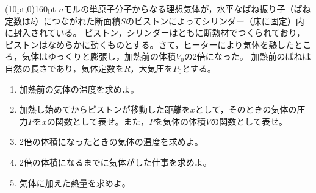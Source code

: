 \hakosyokika
\item
    \begin{mawarikomi}(10pt,0){160pt}{}
    $n$モルの単原子分子からなる理想気体が，水平なばね振り子（ばね定数は$k$）につながれた断面積$S$のピストンによってシリンダー（床に固定）内に封入されている。
    ピストン，シリンダーはともに断熱材でつくられており，ピストンはなめらかに動くものとする。さて，ヒーターにより気体を熱したところ，気体はゆっくりと膨張し，加熱前の体積$V_0$の2倍になった。
    加熱前のばねは自然の長さであり，気体定数を$R$，大気圧を$P_0$とする。    
        \begin{enumerate}
            \item 加熱前の気体の温度を求めよ。
            \item 加熱し始めてからピストンが移動した距離を$x$として，そのときの気体の圧力$P$を$x$の関数として表せ。また，$P$を気体の体積$V$の関数として表せ。
            \item 2倍の体積になったときの気体の温度を求めよ。
            \item 2倍の体積になるまでに気体がした仕事を求めよ。
            \item 気体に加えた熱量を求めよ。
        \end{enumerate}
    \end{mawarikomi}